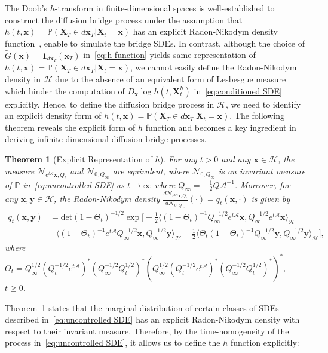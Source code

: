 \documentclass[nohyperref]{article}
\theoremstyle{plain}
\newtheorem{theorem}{Theorem}[section]
\theoremstyle{remark}
\newcommand{\la}{\langle}
\newcommand{\ra}{\rangle}
\newcommand{\mc}{\mathcal}
\newcommand{\mb}{\mathbf}
\begin{document}
The Doob's $h$-transform in finite-dimensional spaces is well-established to construct the diffusion bridge process under the assumption that $h(t, \mb{x}) = \mathbb{P}(\mb{X}_T \in d\mb{x}_T |\mb{X}_t=\mb{x})$ has an explicit Radon-Nikodym density function~\citep{liu2023learning, särkkä2019applied}, enable to simulate the bridge SDEs. 
In contrast, although the choice of $\tilde{G}(\mb{x}) = \mb{1}_{d\mb{x}_T}(\mb{x}_T)$ in~\eqref{eq:h function} yields same representation of $h(t, \mb{x}) = \mathbb{P}(\mb{X}_T \in d\mb{x}_T |\mb{X}_t=\mb{x})$, we cannot easily define the Radon-Nikodym density in $\mc{H}$ due to the absence of an equivalent form of Lesbesgue measure which hinder the computation of $D_{\mb{x}} \log h(t, \mb{X}^h_t)$ in~\eqref{eq:conditioned SDE} explicitly. 
Hence, to define the diffusion bridge process in $\mc{H}$, we need to identify an explicit density form of $h(t, \mb{x}) = \mathbb{P}(\mb{X}_T \in d\mb{x}_T |\mb{X}_t=\mb{x})$. 
The following theorem reveals the explicit form of $h$ function and becomes a key ingredient in deriving infinite dimensional diffusion bridge processes.
\begin{theorem}[Explicit Representation of $h$]\label{Theorem:infinite dimensional density}For any $t >0$ and any $\mb{x} \in \mc{H}$, the measure $\mc{N}_{e^{t\mc{A}}\mb{x}, Q_t}$ and $\mc{N}_{0, Q_{\infty}}$ are equivalent, where $\mc{N}_{0, Q_{\infty}}$ is an invariant measure of $\mathbb{P}$ in~\eqref{eq:uncontrolled SDE} as $t \to \infty$ where $Q_{\infty} = -\frac{1}{2}Q \mc{A}^{-1}$. Moreover, for any $\mb{x}, \mb{y} \in \mc{H}$, the Radon-Nikodym density $\frac{d\mc{N}_{e^{t\mc{A}}\mb{x}, Q_t}}{d\mc{N}_{0, Q_{\infty}}}(\cdot) = q_t(\mb{x}, \cdot)$ is given by
\begin{align}
    q_t(\mb{x}, \mb{y}) &=  \text{det}(1-\Theta_t)^{-1/2} \exp \bigg[ - \frac{1}{2} \la (1-\Theta_t)^{-1} Q^{-1/2}_{\infty}e^{t\mc{A}}\mb{x}, Q^{-1/2}_{\infty}e^{t\mc{A}}\mb{x}  \ra_{\mc{H}} \\
    & + \la (1-\Theta_t)^{-1} e^{t\mc{A}}Q^{-1/2}_{\infty}\mb{x}, Q^{-1/2}_{\infty}\mb{y}  \ra_{\mc{H}} - \frac{1}{2} \la \Theta_t (1-\Theta_t)^{-1} Q^{-1/2}_{\infty}\mb{y}, Q^{-1/2}_{\infty}\mb{y}  \ra_{\mc{H}} \bigg],
\end{align}
where $\Theta_t = Q_{\infty}^{1/2} (Q^{-1/2}_t e^{t\mc{A}})^{*}(Q_{\infty}^{-1/2} Q^{1/2}_t)^{*} (Q_{\infty}^{1/2} (Q^{-1/2}_t e^{t\mc{A}})^{*}(Q_{\infty}^{-1/2} Q^{1/2}_t)^{*})^{*}$, $t \geq 0$.
\end{theorem}
Theorem~\ref{Theorem:infinite dimensional density} states that the marginal distribution of certain classes of SDEs described in~\eqref{eq:uncontrolled SDE} has an explicit Radon-Nikodym density with respect to their invariant measure. Therefore, by the time-homogeneity of the process in~\eqref{eq:uncontrolled SDE}, it allows us to define the $h$ function explicitly:
\end{document}
